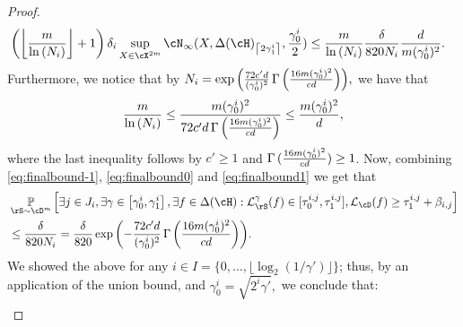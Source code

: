 \begin{proof}
    \begin{align}\label{eq:finalbound0}
        &\left(\left\lfloor\frac{m}{\ln{\left(N_{i} \right)}}\right\rfloor+1\right) \delta_{i}  \sup_{X\in \cX^{2m}}  \cN_{\infty}(X,\dlh_{\left\lceil2\gamma_{1}^{i}\right\rceil},\frac{\gamma_{0}^{i}}{2}) 
        \leq
        \frac{m}{\ln{\left(N_{i} \right)}}
         \frac{\delta }{820N_{i}}\frac{d}{m(\gamma_{0}^{i})^{2}}.
    \end{align}
     Furthermore, we notice that  by $N_{i} =\exp{\left(\frac{72 c'd}{ (\gamma_{0}^{i})^{2}} \operatorname{\Gamma}{\left(  \frac{16m(\gamma_{0}^{i})^{2}}{cd} \right)} \right)},$  we have that
    \begin{align}\label{eq:finalbound1}
        \frac{m}{\ln{\left(N_{i} \right)}} \leq 
     \frac{
        m (\gamma_{0}^{i})^{2} 
        }{
        {72c'd } 
        \operatorname{\Gamma}{\left(  \frac{16m(\gamma_{0}^{i})^{2}}{cd} \right)} }
     \leq \frac{m(\gamma_{0}^{i})^{2}}{d},
    \end{align} 
    where the last inequality follows by $ c'\geq 1$ and $ \operatorname{\Gamma}{(  \frac{16m(\gamma_{0}^{i})^{2}}{cd} )} \geq1 $. Now, combining \cref{eq:finalbound-1}, \cref{eq:finalbound0} and \cref{eq:finalbound1} we get that 
    \begin{align*}
        &\p_{\rS\sim\cD^{m}}\Big[\exists j\in J_{i},
        \exists \gamma \in \left[\gamma_{0}^{i},\gamma_{1}^{i}\right]
        ,\exists f\in \dlh: 
        \ls_{\rS}^{\gamma}(f)\in [\tau_{0}^{i,j},\tau_{1}^{i,j}] 
        ,\ls_{\cD}(f) \geq \tau_{1}^{i,j} 
        + \beta_{i,j}
        \Big] 
        \\
        &\leq \frac{\delta}{820N_{i}}=\frac{\delta}{820}\exp{\left(-\frac{72 c'd}{ (\gamma_{0}^{i})^{2}} \func{\left(  \frac{16 m(\gamma_{0}^{i})^{2}}{cd} \right)} \right)}.
    \end{align*}
    We showed the above for any $ i \in I=\{   0,\ldots,\lfloor\log_{2}(  1/\gamma')\rfloor \}$; thus, by an application of the union bound, and $\gamma_{0}^{i}= \sqrt{2^{i}\gamma' },$   we conclude that: 
    \begin{align*}

\end{align*}
\end{proof}
